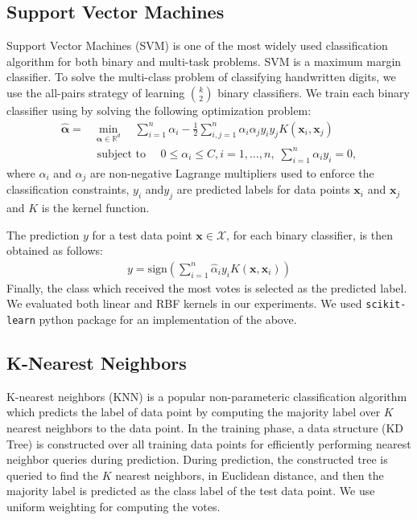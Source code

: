 \documentclass[10pt]{scrartcl}
\newcommand{\R}{\mathbb{R}}                       %
\newcommand{\vx}{\mathbf{x}}                        %
\newcommand{\dX}{\mathcal{X}}                     %
\newcommand{\valpha}{\boldsymbol{\alpha}}  %
\begin{document}
\subsection*{Support Vector Machines}
Support Vector Machines (SVM) is one of the most widely used classification algorithm for both binary and multi-task problems.
SVM is a maximum margin classifier. To solve the multi-class problem of classifying handwritten digits, we use the all-pairs strategy
of learning ${k \choose 2}$ binary classifiers. We train each binary classifier using by solving the following optimization problem:
\begin{align*}
\hat{\valpha} = 
& \min_{\valpha \in \R^d}  \quad \sum_{i=1}^{n} \alpha_i - \frac{1}{2} \sum_{i,j=1}^{n} \alpha_i \alpha_j y_i y_j K(\vx_i,\vx_j) \\ 
& \text{ subject to } \quad  0 \leq \alpha_i \leq C, i=1,\ldots,n, \;  \sum_{i=1}^{n} \alpha_i y_i = 0,
\end{align*}
where $\alpha_i$ and $\alpha_j$ are non-negative Lagrange multipliers  used to enforce the classification constraints, 
$y_i$ and$y_j$ are predicted labels for data points $\vx_i$  and $\vx_j$ and $K$ is the kernel function. 

The prediction $y$ for a test data point $\vx \in \dX$, for each binary classifier, is then obtained as follows:
\begin{align*}
y = \mathrm{sign} \left( \sum_{i=1}^n \hat{\alpha}_i y_i K(\vx, \vx_i) \right)
\end{align*}
Finally, the class which received the most votes is selected as the predicted label. We evaluated both linear and RBF kernels
in our experiments.  We used \texttt{scikit-learn} python package for an implementation of the above.

\subsection*{K-Nearest Neighbors}
K-nearest neighbors (KNN) is a popular non-parameteric classification algorithm which predicts the label of data point
by computing the majority label over $K$ nearest neighbors to the data point. In the training phase, 
a data structure (KD Tree) is constructed over all training data points for efficiently performing nearest neighbor queries during prediction.
During prediction, the constructed tree is queried to find the $K$ nearest neighbors, in Euclidean distance,
 and then the majority label is predicted as the class label of the test data point. We use uniform weighting for computing the votes.
\end{document}
